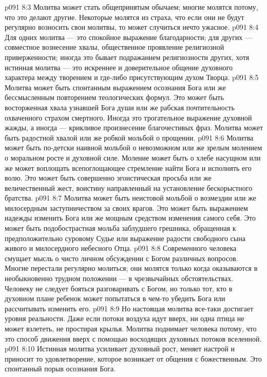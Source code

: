 \vs p091 8:3 \pc Молитва может стать общепринятым обычаем; многие молятся потому, что это делают другие. Некоторые молятся из страха, что если они не будут регулярно возносить свои молитвы, то может случиться нечто ужасное.
\vs p091 8:4 Для одних молитва --- это спокойное выражение благодарности; для других --- совместное вознесение хвалы, общественное проявление религиозной приверженности; иногда это бывает подражанием религиозности других, хотя истинная молитва --- это искреннее и доверительное общение духовного характера между творением и где\hyp{}либо присутствующим духом Творца.
\vs p091 8:5 Молитва может быть спонтанным выражением осознания Бога или же бессмысленным повторением теологических формул. Это может быть восторженная хвала узнавшей Бога души или же рабская почтительность охваченного страхом смертного. Иногда это трогательное выражение духовной жажды, а иногда --- крикливое произнесение благочестивых фраз. Молитва может быть радостной хвалой или же робкой мольбой о прощении.
\vs p091 8:6 Молитва может быть по\hyp{}детски наивной мольбой о невозможном или же зрелым молением о моральном росте и духовной силе. Моление может быть о хлебе насущном или же может воплощать всепоглощающее стремление найти Бога и исполнять его волю. Это может быть совершенно эгоистическая просьба или же величественный жест, воистину направленный на установление бескорыстного братства.
\vs p091 8:7 Молитва может быть неистовой мольбой о возмездии или же милосердным заступничеством за своих врагов. Это может быть выражением надежды изменить Бога или же мощным средством изменения самого себя. Это может быть подобострастная мольба заблудшего грешника, обращенная к предположительно суровому Судье или выражение радости свободного сына живого и милосердного небесного Отца.
\vs p091 8:8 \pc Современного человека смущает мысль о чисто личном обсуждении с Богом различных вопросов. Многие перестали регулярно молиться; они молятся только когда оказываются в необыкновенно трудном положении --- в чрезвычайных обстоятельствах. Человеку не следует бояться разговаривать с Богом, но только тот, кто в духовном плане ребенок может попытаться в чем\hyp{}то убедить Бога или рассчитывать изменить его.
\vs p091 8:9 \pc Но настоящая молитва все\hyp{}таки достигает уровня реальности. Даже если потоки воздуха идут вверх, ни одна птица не может взлететь, не простирая крылья. Молитва поднимает человека потому, что это способ движения вверх с помощью восходящих духовных потоков вселенной.
\vs p091 8:10 Истинная молитва усиливает духовный рост, меняет настрой и приносит то удовлетворение, которое возникает от общения с божественным. Это спонтанный порыв осознания Бога.
